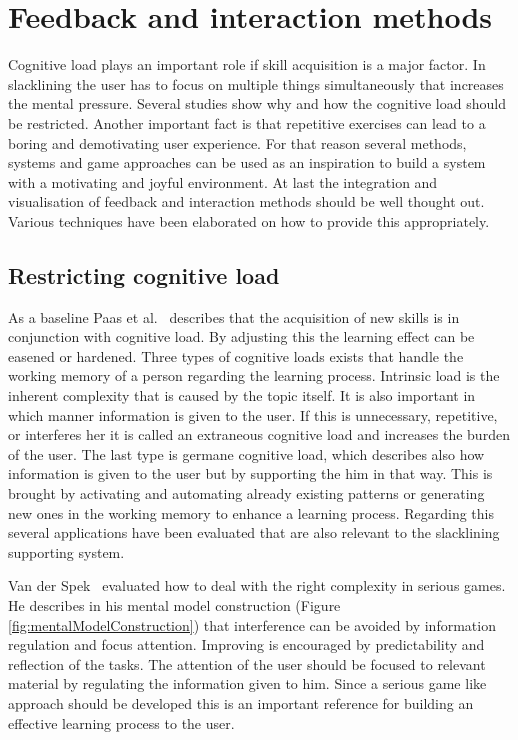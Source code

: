 \section{Feedback and interaction methods}

Cognitive load plays an important role if skill acquisition is a major factor. In slacklining the user has to focus on multiple things simultaneously that increases the mental pressure. Several studies show why and how the cognitive load should be restricted. Another important fact is that repetitive exercises can lead to a boring and demotivating user experience. For that reason several methods, systems and game approaches can be used as an inspiration to build a system with a motivating and joyful environment. At last the integration and visualisation of feedback and interaction methods should be well thought out. Various techniques have been elaborated on how to provide this appropriately.

\subsection{Restricting cognitive load}

As a baseline Paas et al.~\cite{Paas2003-xt} describes that the acquisition of new skills is in conjunction with cognitive load. By adjusting this the learning effect can be easened or hardened. Three types of cognitive loads exists that handle the working memory of a person regarding the learning process. Intrinsic load is the inherent complexity that is caused by the topic itself. It is also important in which manner information is given to the user. If this is unnecessary, repetitive, or interferes her it is called an extraneous cognitive load and increases the burden of the user. The last type is germane cognitive load, which describes also how information is given to the user but by supporting the him in that way. This is brought by activating and automating already existing patterns or generating new ones in the working memory to enhance a learning process. Regarding this several applications have been evaluated that are also relevant to the slacklining supporting system.

Van der Spek~\cite{Van_der_Spek2010-fe} evaluated how to deal with the right complexity in serious games. He describes in his mental model construction (Figure \ref{fig:mentalModelConstruction}) that interference can be avoided by information regulation and focus attention. Improving is encouraged by predictability and reflection of the tasks. The attention of the user should be focused to relevant material by regulating the information given to him. Since a serious game like approach should be developed this is an important reference for building an effective learning process to the user.

